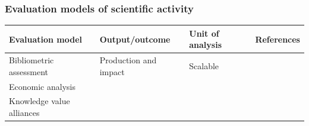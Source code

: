 \documentclass[]{article}
\begin{document}
\subsubsection{Evaluation models of scientific
activity}\label{evaluation-models-of-scientific-activity}

\begin{longtable}[]{@{}llll@{}}
\toprule
\begin{minipage}[b]{0.23\columnwidth}\raggedright\strut
Evaluation model\strut
\end{minipage} & \begin{minipage}[b]{0.22\columnwidth}\raggedright\strut
Output/outcome\strut
\end{minipage} & \begin{minipage}[b]{0.25\columnwidth}\raggedright\strut
Unit of analysis\strut
\end{minipage} & \begin{minipage}[b]{0.16\columnwidth}\raggedright\strut
References\strut
\end{minipage}\tabularnewline
\midrule
\endhead
\begin{minipage}[t]{0.23\columnwidth}\raggedright\strut
Bibliometric assessment\strut
\end{minipage} & \begin{minipage}[t]{0.22\columnwidth}\raggedright\strut
Production and impact\strut
\end{minipage} & \begin{minipage}[t]{0.25\columnwidth}\raggedright\strut
Scalable\strut
\end{minipage} & \begin{minipage}[t]{0.16\columnwidth}\raggedright\strut
\strut
\end{minipage}\tabularnewline
\begin{minipage}[t]{0.23\columnwidth}\raggedright\strut
Economic analysis\strut
\end{minipage} & \begin{minipage}[t]{0.22\columnwidth}\raggedright\strut
\strut
\end{minipage} & \begin{minipage}[t]{0.25\columnwidth}\raggedright\strut
\strut
\end{minipage} & \begin{minipage}[t]{0.16\columnwidth}\raggedright\strut
\strut
\end{minipage}\tabularnewline
\begin{minipage}[t]{0.23\columnwidth}\raggedright\strut
Knowledge value alliances\strut

\end{minipage}
\end{longtable}
\end{document}
